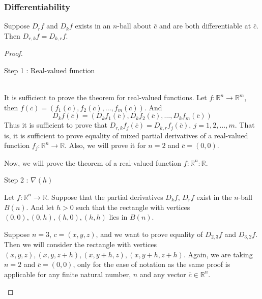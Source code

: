 \subsubsection{Differentiability}
\begin{theorem}
Suppose $D_r f$ and $D_k f$ exists in an $n$-ball about $\bar{c}$ and are both differentiable at $\bar{c}$.
Then $D_{r,k} f = D_{k,r} f$.
\end{theorem}
\begin{proof}
\begin{commentary}Step 1 : Real-valued function\end{commentary}\\
	It is sufficient to prove the theorem for real-valued functions.
	Let $f : \mathbb{R}^n \to \mathbb{R}^m$, then $f(\bar{c}) = \left( f_1(\bar{c}),f_2(\bar{c}),\dots,f_m(\bar{c}) \right)$.
	And
	\[ D_k f(\bar{c}) = \left( D_k f_1(\bar{c}), D_k f_2(\bar{c}), \dots, D_k f_m(\bar{c}) \right) \]
	Thus it is sufficient to prove that $D_{r,k}f_j(\bar{c}) = D_{k,r}f_j(\bar{c}),\ j = 1,2,\dots,m$.
	That is, it is sufficient to prove equality of mixed partial derivatives of a real-valued function $f_j : \mathbb{R}^n \to \mathbb{R}$.
	Also, we will prove it for $n = 2$ and $\bar{c} = (0,0)$.
\begin{commentary}
	Now, we will prove the theorem of a real-valued function $f : \mathbb{R}^n : \mathbb{R}$.\\
\end{commentary}
\begin{commentary}Step 2 : $\nabla(h)$\end{commentary}

Let $f : \mathbb{R}^n \to \mathbb{R}$.
Suppose that the partial derivatives $D_k f$, $D_r f$ exist in the $n$-ball $B(n)$.
And let $h > 0$ such that the rectangle with vertices $(0,0), (0,h), (h,0), (h,h)$ lies in $B(n)$.

\begin{commentary} Suppose $n=3$, $c = (x,y,z)$, and we want to prove equality of $D_{2,3} f$ and $D_{3,2} f$.
Then we will consider the rectangle with vertices $(x,y,z), (x,y,z+h), (x,y+h,z), (x,y+h,z+h)$.
Again, we are taking $n=2$ and $\bar{c} = (0,0)$, only for the ease of notation as the same proof is applicable for any finite natural number, $n$ and any vector $\bar{c} \in \mathbb{R}^n$.\end{commentary}


\end{proof}
